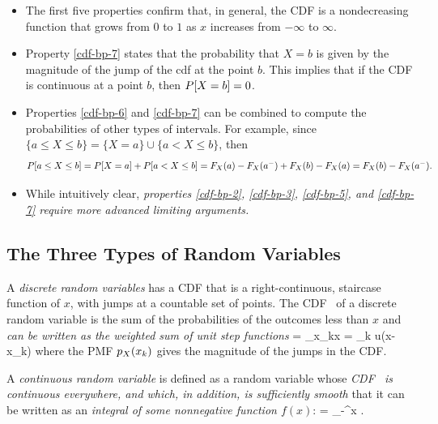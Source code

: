 	\begin{itemize}

		\item
		The first five properties confirm that,
		in general, the CDF is
		a nondecreasing function that grows from $0$ to $1$
		as $x$ increases from $-\infty$ to $\infty$.

		\item
		Property \ref{cdf-bp-7}
		states that the probability that $X = b$
		is given by the magnitude of the jump of the cdf at the point $b$.
		This implies that if the CDF is continuous at a point $b$,
		then $P[X = b] = 0$.

		\item Properties \ref{cdf-bp-6} and \ref{cdf-bp-7}
		can be combined to compute the probabilities of other types
		of intervals.
		For example,
		since $\{a\leq X\leq b\} = \{X=a\} \cup \{a<X\leq b\}$,
		then
		\[
			P[a\leq X\leq b]
			= P[X=a] + P[a<X\leq b]
			= F_{X}(a)-F_{X}(a^-)
			+ F_{X}(b) - F_{X}(a)
			= F_{X}(b) -F_{X}(a^-).
		\]

		\item While intuitively clear,
		\emph{
		properties
		\ref{cdf-bp-2},
		\ref{cdf-bp-3},
		\ref{cdf-bp-5},
		and
		\ref{cdf-bp-7}
		require more advanced limiting arguments.}


	\end{itemize}

	\renewcommand{\labelenumi}{\arabic{enumi}.}
	\renewcommand{\theenumi}{\arabic{enumi}.}


\eit

\subsection{The Three Types of Random Variables}

\bit
	\item
	A \emph{discrete random variables}
	has a CDF that is a right-continuous,
	staircase function of $x$,
	with jumps at a countable set of points.
	The CDF \ of a discrete random variable
	is the sum of the probabilities of the outcomes
	less than $x$
	and \emph{can be written as the weighted sum of unit step functions}
		 = \sum_{x_k\leq x} 
		= \sum_k  u(x-x_k)
	\eeql
	where the PMF $p_{X}(x_k)$ gives the magnitude of the jumps in the CDF.

	\item A \emph{continuous random variable}
	is defined as a random variable whose \emph{CDF \
	is continuous everywhere,
	and which, in addition, is sufficiently smooth}
	that it can be written as an \emph{integral of some nonnegative function $f(x)$}:
	\beql{eq-cdf-as-int-pdf}
		 = \int_{-\infty}^x  \dx.
	\eeql

